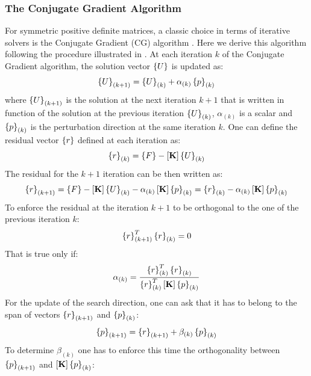 \subsubsection{The Conjugate Gradient Algorithm}
 For symmetric positive definite matrices, a classic choice in terms of iterative solvers is the Conjugate Gradient (CG) algorithm \cite{hestenes1952methods}. Here we derive this algorithm following the procedure illustrated in \cite{saad2003iterative}. At each iteration $k$ of the Conjugate Gradient algorithm, the solution vector $\left\lbrace{U}\right \rbrace$ is updated as:
\begin{equation}
\left\lbrace{U}\right \rbrace_{(k+1)}=\left\lbrace{U}\right \rbrace_{(k)}+\alpha_{(k)}\left\lbrace{p}\right \rbrace_{(k)}
\end{equation}
where $\left\lbrace{U}\right \rbrace_{(k+1)}$ is the solution at the next iteration $k+1$ that is written in function of the solution at the previous iteration $\left\lbrace{U}\right \rbrace_{(k)}$, $\alpha_{(k)}$ is a scalar and $\left\lbrace{p}\right \rbrace_{(k)}$ is the perturbation direction at the same iteration $k$. One can define the residual vector $\left\lbrace{r}\right \rbrace$ defined at each iteration as:
\begin{equation}
\left\lbrace{r}\right \rbrace_{(k)}=\left\lbrace{F}\right \rbrace-\left[{\mathbf{K}}\right]\left\lbrace{U}\right \rbrace_{(k)}
\end{equation}
The residual for the $k+1$ iteration can be then written as:
\begin{equation}
\left\lbrace{r}\right \rbrace_{(k+1)}=\left\lbrace{F}\right \rbrace-\left[{\mathbf{K}}\right]\left\lbrace{U}\right \rbrace_{(k)}-\alpha_{(k)}\left[{\mathbf{K}}\right]\left\lbrace{p}\right \rbrace_{(k)}=\left\lbrace{r}\right \rbrace_{(k)}-\alpha_{(k)}\left[{\mathbf{K}}\right]\left\lbrace{p}\right \rbrace_{(k)}
\end{equation}
To enforce the residual at the iteration $k+1$ to be orthogonal to the one of the previous iteration $k$:
\begin{equation}
\left\lbrace{r}\right \rbrace_{(k+1)}^T \left\lbrace{r}\right \rbrace_{(k)}=0
\end{equation}
That is true only if:
\begin{equation}
\alpha_{(k)}=\frac{\left\lbrace{r}\right \rbrace_{(k)}^T\left\lbrace{r}\right \rbrace_{(k)}}{\left\lbrace{r}\right \rbrace_{(k)}^T\left[{\mathbf{K}}\right]\left\lbrace{p}\right \rbrace_{(k)}}
\end{equation}
For the update of the search direction, one can ask that it has to belong to the span of vectors $\left\lbrace{r}\right \rbrace_{(k+1)}$ and $\left\lbrace{p}\right \rbrace_{(k)}$:
\begin{equation}
\label{eq.1.128}
\left\lbrace{p}\right \rbrace_{(k+1)}=\left\lbrace{r}\right \rbrace_{(k+1)} +\beta_{(k)}\left\lbrace{p}\right \rbrace_{(k)}
\end{equation}
To determine $\beta_{(k)}$ one has to enforce this time the orthogonality between $\left\lbrace{p}\right \rbrace_{(k+1)}$ and $\left[{\mathbf{K}}\right]\left\lbrace{p}\right \rbrace_{(k)}$:
